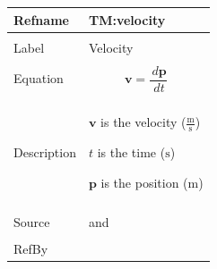 \documentclass[12pt]{article}
\begin{document}
\begin{minipage}{\textwidth}
\begin{tabular}{>{\raggedright}p{}>{\raggedright\arraybackslash}p{}}
\toprule \textbf{Refname} & \textbf{TM:velocity}
\label{TM:velocity}
\\ \midrule \\
Label & Velocity
        
\\ \midrule \\
Equation & \begin{displaymath}
           \mathbf{v}=\frac{\,d\mathbf{p}}{\,dt}
           \end{displaymath}
\\ \midrule \\
Description & \begin{symbDescription}
              \item{$\mathbf{v}$ is the velocity ($\frac{\text{m}}{\text{s}}$)}
              \item{$t$ is the time (${\text{s}}$)}
              \item{$\mathbf{p}$ is the position (${\text{m}}$)}
              \end{symbDescription}
\\ \midrule \\
Source & \cite{velocityWiki} and \cite[(pg. 6)]{hibbeler2004}
         
\\ \midrule \\
RefBy & 
\\ \bottomrule
\end{tabular}
\end{minipage}
\vspace{\baselineskip}
\noindent
\end{document}
